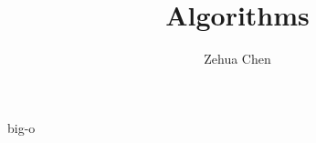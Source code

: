 \documentclass[letterpaper, 11pt]{report}
\title{Algorithms}
\author{Zehua Chen}
\begin{document}
  \maketitle
  \tableofcontents

  {big-o}
\end{document}
